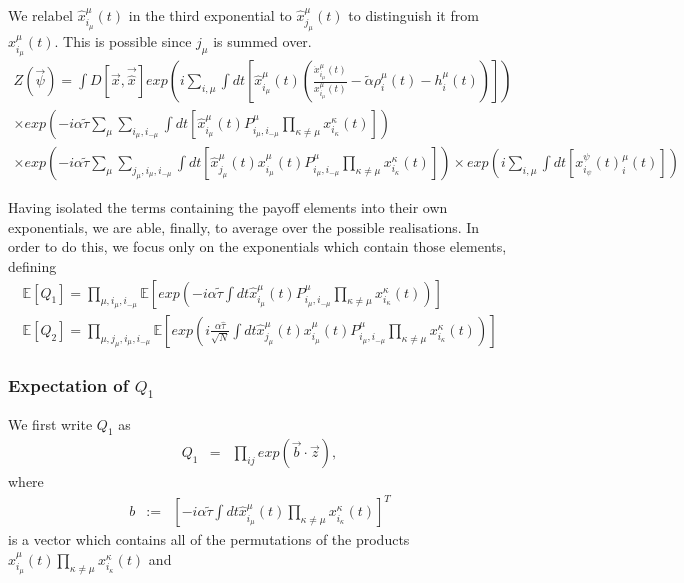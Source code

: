\documentclass{article}
\newcommand{\xmu}[2]{x_{#1_#2}^{#2}(t)}
\newcommand{\payoff}[2]{P^{#2}_{#1_#2, #1_{-#2}}}
\newcommand{\dxmu}[1]{\dot{x}_{#1_\mu}^{\mu} (t)}
\newcommand{\hxmu}[1]{\hat{x}_{#1_\mu}^{\mu} (t)}
\newcommand{\talpha}{\tilde{\alpha}}
\newcommand{\ttau}{\tilde{\tau}}
\newcommand{\htau}{\hat{\tau}}
\begin{document}
We relabel $\hxmu{i}$ in the third exponential to $\hxmu{j}$ to distinguish it from $\xmu{i}{\mu}$. This is possible since $j_\mu$ is summed over.
%
\begin{equation}
	\begin{split}
	Z(\Vec{\psi}) = \int D[\Vec{x}, \Vec{\hat{x}}] exp \left( i \sum_{i, \mu} \int dt \left[ \hxmu{i} (\frac{\dxmu{i}}{\xmu{i}{\mu}} - \talpha \rho_i^\mu (t) - h_i^\mu (t)) \right] \right) \\
	\times exp \left(-i \alpha \ttau \sum_{\mu} \sum_{i_\mu, i_{-\mu}} \int dt \left [\hxmu{i} \payoff{i}{\mu} \prod_{\kappa \neq \mu} \xmu{i}{\kappa} \right] \right) \\
    \times exp \left(-i \alpha \ttau \sum_{\mu} \sum_{j_\mu, i_\mu, i_{-\mu}} \int dt \left[\hxmu{j}  \xmu{i}{\mu} \payoff{i}{\mu} \prod_{\kappa \neq \mu} \xmu{i}{\kappa} \right] \right)
	\times exp(i \sum_{i, \mu}
	\int dt[\xmu{i} \psi^\mu_i(t)])
\end{split}
\end{equation}

Having isolated the terms containing the payoff elements into their own exponentials, we are able, finally, to average over the possible realisations. In order to do this, we focus only on the exponentials which contain those elements, defining
%
\begin{subequations}
\begin{align}
    \mathbb{E}[Q_1] = \prod_{\mu, i_\mu, i_{-\mu}} \mathbb{E} \left[exp(-i \alpha \ttau \int dt \hxmu{i} \payoff{i}{\mu} \prod_{\kappa \neq \mu} \xmu{i}{\kappa}) \right] \\
    \mathbb{E}[Q_2] = \prod_{\mu, j_\mu, i_\mu, i_{-\mu}} \mathbb{E} \left[exp(i \frac{\alpha \htau}{\sqrt{N}} \int dt \hxmu{j} \xmu{i}{\mu} \payoff{i}{\mu} \prod_{\kappa \neq \mu} \xmu{i}{\kappa}) \right]
\end{align}
\end{subequations}

\subsubsection{Expectation of $Q_1$}

We first write $Q_1$ as 
%
\begin{eqnarray*}
    Q_1 & = & \prod_{ij} exp(\Vec{b} \cdot \Vec{z}),
\end{eqnarray*}
%
where
%
\begin{eqnarray*}
       b & := & [ -i \alpha \ttau \int dt \hxmu{i} \prod_{\kappa \neq \mu} \xmu{i}{\kappa} ]^T 
\end{eqnarray*}
%
is a vector which contains all of the permutations of the products $\hxmu{i} \prod_{\kappa \neq \mu} \xmu{i}{\kappa}$ and
\end{document}
